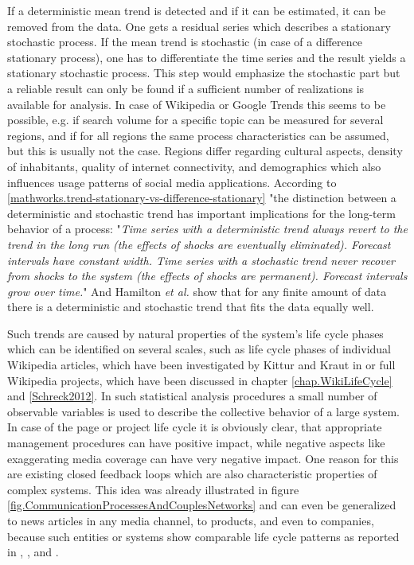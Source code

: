 \documentclass[a4paper,10pt]{scrbook}
\begin{document}
If a deterministic mean trend is detected and if it can be estimated, it can be removed from the data. One gets a residual series which 
describes a stationary stochastic process. If the mean trend is stochastic (in case of a difference stationary process), one has to differentiate the time series and the result yields a stationary stochastic process. This step would emphasize the stochastic part but a reliable result can only be found if a sufficient number of realizations is available for analysis. In case of Wikipedia or Google Trends this seems to be possible, e.g. if search volume for a specific topic can be measured for several regions, and if for all regions the same process characteristics can be assumed, but this is usually not the case. Regions differ regarding cultural aspects, density of inhabitants, quality of internet connectivity, and demographics which also influences usage patterns of social media applications. According to \ref{mathworks.trend-stationary-vs-difference-stationary} "the distinction 
between a deterministic and stochastic trend has important implications for the long-term behavior of a process: "\textit{Time series with a deterministic trend always revert to the trend in the long run (the effects of shocks are eventually eliminated). Forecast intervals have constant width. Time series with a stochastic trend never recover from shocks to the system (the effects of shocks are permanent). Forecast intervals grow over time.}" And Hamilton \textit{et al.} \cite{Hamilton1994} show that for any finite amount of data there is a deterministic and stochastic trend that fits the data equally well. 

Such trends are caused by natural properties of the system's life cycle phases which can be identified on several scales, such as life cycle phases of individual Wikipedia articles, which have been investigated by Kittur and Kraut in \cite{Kittur2008} or full Wikipedia projects, which have been discussed in chapter \ref{chap.WikiLifeCycle} and \ref{Schreck2012}. In such statistical analysis procedures a small number of observable variables is used to describe the collective behavior of a large system. In case of the page or project life cycle it is obviously clear, that appropriate management procedures can have positive impact, while negative aspects like exaggerating media coverage can have very negative impact. One reason for this are existing closed feedback loops which are also characteristic properties of complex systems. This idea was already illustrated in figure \ref{fig.CommunicationProcessesAndCouplesNetworks} and can even be generalized to news articles in any media channel, to products, and even to companies, because such entities or systems show comparable life cycle patterns as reported in \cite{Castillo2014}, \cite{Wood1990}, and \cite{Wang2006}.
\end{document}
